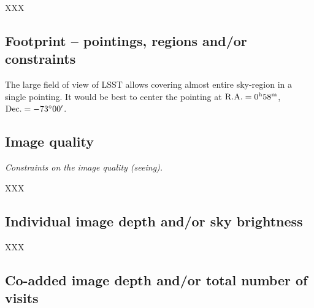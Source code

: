 \documentclass[12pt,letterpaper]{article}
\begin{document}
XXX

\vspace{.3in}

\subsection{Footprint -- pointings, regions and/or constraints}

The large field of view of LSST allows covering almost entire sky-region in a single pointing. 
It would be best to center the pointing at  
${\rm R.A.} = 0^{\rm h}58^{\rm m}$,  %
${\rm Dec.} = -73^{\circ}00'$. 

\subsection{Image quality}
\begin{footnotesize}{\it Constraints on the image quality (seeing).}\end{footnotesize}

XXX

\subsection{Individual image depth and/or sky brightness}

XXX

\subsection{Co-added image depth and/or total number of visits}
\end{document}
